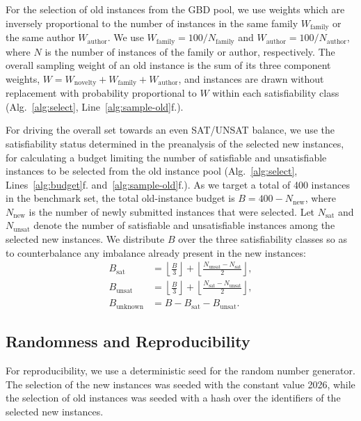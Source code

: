 \documentclass[conference]{IEEEtran}
\begin{document}
For the selection of old instances from the GBD pool, we use weights which are inversely proportional to the number of instances in the same family $W_\text{family}$ or the same author $W_\text{author}$.
We use $W_\text{family} = 100 / N_\text{family}$ and $W_\text{author} = 100 / N_\text{author}$, where $N$ is the number of instances of the family or author, respectively.
The overall sampling weight of an old instance is the sum of its three component weights, $W = W_\text{novelty} + W_\text{family} + W_\text{author}$, and instances are drawn without replacement with probability proportional to $W$ within each satisfiability class (Alg.~\ref{alg:select}, Line~\ref{alg:sample-old}f.).

For driving the overall set towards an even SAT/UNSAT balance, we use the satisfiability status determined in the preanalysis of the selected new instances, for calculating a budget limiting the number of satisfiable and unsatisfiable instances to be selected from the old instance pool (Alg.~\ref{alg:select}, Lines~\ref{alg:budget}f. and~\ref{alg:sample-old}f.).
As we target a total of 400 instances in the benchmark set, the total old-instance budget is $B = 400 - N_\text{new}$, where $N_\text{new}$ is the number of newly submitted instances that were selected.
Let $N_\text{sat}$ and $N_\text{unsat}$ denote the number of satisfiable and unsatisfiable instances among the selected new instances.
We distribute $B$ over the three satisfiability classes so as to counterbalance any imbalance already present in the new instances:
\begin{align*}
B_\text{sat} &= \left\lfloor \tfrac{B}{3} \right\rfloor + \left\lfloor \tfrac{N_\text{unsat} - N_\text{sat}}{2} \right\rfloor, \\
B_\text{unsat} &= \left\lfloor \tfrac{B}{3} \right\rfloor + \left\lfloor \tfrac{N_\text{sat} - N_\text{unsat}}{2} \right\rfloor, \\
B_\text{unknown} &= B - B_\text{sat} - B_\text{unsat}.
\end{align*}

\subsection{Randomness and Reproducibility}\label{sec:randomness}

For reproducibility, we use a deterministic seed for the random number generator.
The selection of the new instances was seeded with the constant value 2026, while the selection of old instances was seeded with a hash over the identifiers of the selected new instances.
\end{document}
